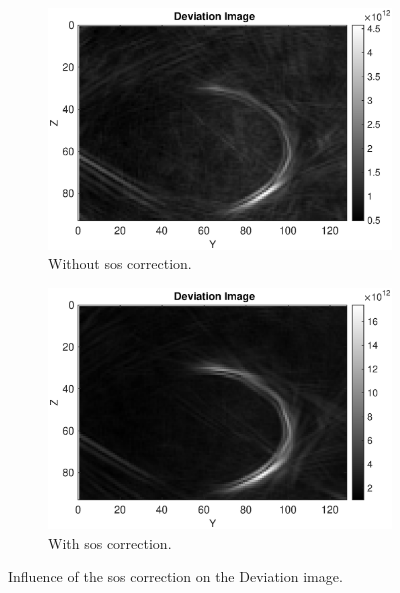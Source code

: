 \begin{figure}[H]
     \centering
     \begin{subfigure}[b]{0.47\textwidth}
                  \centering
         \includegraphics[width=1.09\textwidth]{Graphics/Results/14_vecs_sos_vs_noSos/Deviation_14vecs_no_sos_x_direction.eps}
         \caption{Without \ac{sos} correction.}
         \label{leer}
     \end{subfigure}
     \hfill
     \begin{subfigure}[b]{0.47\textwidth}
         \centering
         \includegraphics[width=1.09\linewidth]{Graphics/Results/14_vecs_sos_vs_noSos/Deviation_14vecs_with_sos_x_direction.eps}
         \caption{With \ac{sos} correction. }
         \label{leer}
     \end{subfigure}
        \caption{Influence of the \ac{sos} correction on the Deviation image.}
        \label{leer}
\end{figure}





